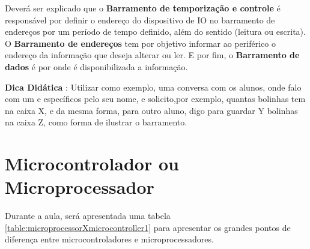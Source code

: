 \documentclass[12pt,a4paper]{report}
\begin{document}
Deverá ser explicado que o \textbf{Barramento de temporização e controle} é responsável por definir o endereço do dispositivo de IO no barramento de endereços por um período de tempo definido, além do sentido (leitura ou escrita). O \textbf{Barramento de endereços} tem por objetivo informar ao periférico o endereço da informação que deseja alterar ou ler. E por fim, o \textbf{Barramento de dados} é por onde é disponibilizada a informação.

\textbf{Dica Didática} : Utilizar como exemplo, uma conversa com os alunos, onde falo com um e específicos pelo seu nome, e solicito,por exemplo, quantas bolinhas tem na caixa X, e da mesma forma, para outro aluno, digo para guardar Y bolinhas na caixa Z, como forma de ilustrar o barramento.

\section{Microcontrolador ou Microprocessador}

Durante a aula, será apresentada uma tabela \ref{table:microprocessorXmicrocontroller1} para apresentar os grandes pontos de diferença entre microcontroladores e microprocessadores.
\end{document}

